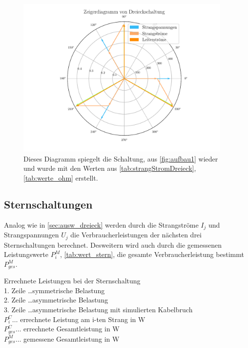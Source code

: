 \documentclass[12pt,english,ngerman]{scrartcl}
\begin{document}
\begin{figure}[H]
	\begin{center}
		\includegraphics[width = 0.95\textwidth]{figures/zeigerDreieck.pdf}
	\end{center}
	\caption[Zeigerdiagramm einer sysmetrisch ohmsch-belastete Dreieckschaltung]{ Dieses
		Diagramm spiegelt die Schaltung, aus \autoref{fig:aufbau1} wieder und wurde mit
		den Werten aus \autoref{tab:strangStromDreieck}, \autoref{tab:werte_ohm}
		erstellt.
	}\label{fig:zeigerDreieck}
\end{figure}

\subsection{Sternschaltungen}\label{sec:aus_stern}

Analog wie in \autoref{sec:ausw_dreieck} werden durch die Strangströme $I_j$
und Strangspannungen $U_j$ die Verbraucherleistungen der nächsten drei
Sternschaltungen berechnet. Desweitern wird auch durch die gemessenen
Leistungswerte $P_i^M$, \autoref{tab:wert_stern}, die gesamte
Verbraucherleistung bestimmt $P_{ges}^{M}$.

\begin{table}[H]
	\caption[Errechnete Leistungen bei der Sternschaltung]{Errechnete Leistungen bei der
		Sternschaltung                                                    \\
		1. Zeile \dots symmetrische Belastung                             \\
		2. Zeile \dots asymmetrische Belastung                            \\
		3. Zeile \dots asymmetrische Belastung mit simulierten Kabelbruch \\
		$P_i^C \dots$ errechnete Leistung am i-ten Strang in W            \\
		$P_{ges}^C \dots$ errechnete Gesamtleistung in W                  \\
		$P_{ges}^M \dots$ gemessene Gesamtleistung in W
	}\label{tab:powerStern}
	\centering
	
\end{table}
\end{document}
